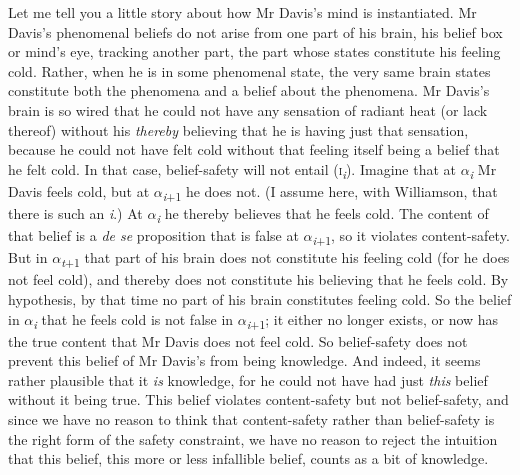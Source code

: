 Let me tell you a little story about how Mr Davis's mind is instantiated. Mr Davis's phenomenal beliefs do not arise from one part of his brain, his belief box or mind's eye, tracking another part, the part whose states constitute his feeling cold. Rather, when he is in some phenomenal state, the very same brain states constitute both the phenomena and a belief about the phenomena. Mr Davis's brain is so wired that he could not have any sensation of radiant heat (or lack thereof) without his \textit{thereby} believing that he is having just that sensation, because he could not have felt cold without that feeling itself being a belief that he felt cold. In that case, belief-safety will not entail (\textsc{i}\textit{\textsubscript{i}}). Imagine that at ${\alpha}$\textit{\textsubscript{i}} Mr Davis feels cold, but at ${\alpha}$\textit{\textsubscript{i}}\textsubscript{+1} he does not. (I assume here, with Williamson, that there is such an \textit{i}.) At ${\alpha}$\textit{\textsubscript{i}} he thereby believes that he feels cold. The content of that belief is a \textit{de se} proposition that is false at ${\alpha}$\textit{\textsubscript{i}}\textsubscript{+1}, so it violates content-safety. But in ${\alpha}$\textit{\textsubscript{t}}\textsubscript{+1} that part of his brain does not constitute his feeling cold (for he does not feel cold), and thereby does not constitute his believing that he feels cold. By hypothesis, by that time no part of his brain constitutes feeling cold. So the belief in ${\alpha}$\textit{\textsubscript{i}} that he feels cold is not false in ${\alpha}$\textit{\textsubscript{i}}\textsubscript{+1}; it either no longer exists, or now has the true content that Mr Davis does not feel cold. So belief-safety does not prevent this belief of Mr Davis's from being knowledge. And indeed, it seems rather plausible that it \textit{is} knowledge, for he could not have had just \textit{this} belief without it being true. This belief violates content-safety but not belief-safety, and since we have no reason to think that content-safety rather than belief-safety is the right form of the safety constraint, we have no reason to reject the intuition that this belief, this more or less infallible belief, counts as a bit of knowledge.

